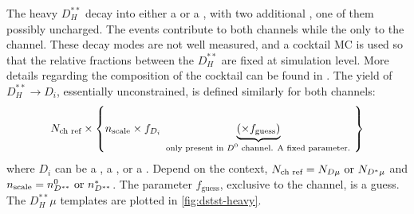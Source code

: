 The heavy $D_H^{**}$ decay into either a \Dz or a \Dstar, with two additional
\pion, one of them possibly uncharged.
The \Dstarp events contribute to both channels while the \Dstarz only to the \Dz
channel.
These decay modes are not well measured, and a cocktail MC is used so that
the relative fractions between the $D_H^{**}$ are fixed at simulation level.
More details regarding the composition of the cocktail can be found in
\cite{LHCb-ANA-2020-056}.
The yield of $D_H^{**} \rightarrow D_i$, essentially unconstrained, is defined
similarly for both channels:
\begin{equation}
    N_\text{ch ref} \times \left\{
        n_\text{scale} \times f_{D_i}
        \underbrace{(\times f_\text{guess})}_\text{
            only present in \Dz channel. A fixed parameter.
        }
    \right\}
\end{equation}
where $D_i$ can be a \Dz, a \Dstarz, or a \Dstarp.
Depend on the context,
$N_\text{ch ref} = N_{D\mu} \text{ or } N_{{{D}^*}\mu}$ and
$n_\text{scale} = n^{0}_{D^{**}} \text{ or } n_{D^{**}}^{*}$.
The parameter $f_\text{guess}$, exclusive to the \Dz channel, is a guess.
The $D_H^{**}\mu$ templates are plotted in
\cref{fig:dstst-heavy}.

